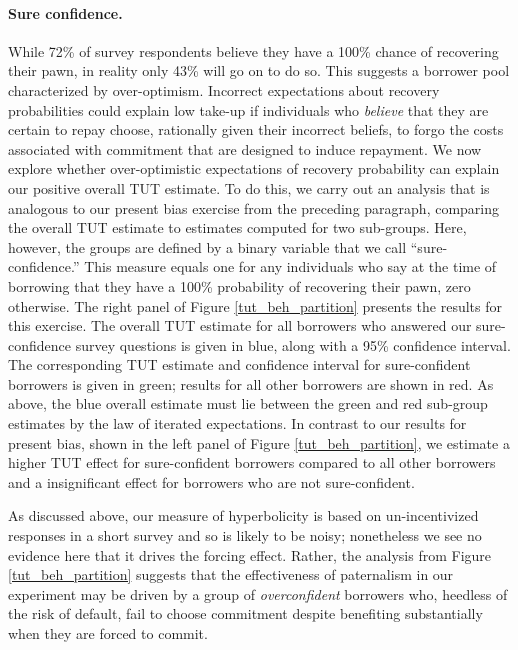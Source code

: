 \documentclass[oneside,11pt]{article}
\begin{document}
\paragraph{Sure confidence.} While 72\% of survey respondents believe they have a 100\% chance of recovering their pawn, in reality only 43\% will go on to do so.  
This suggests a borrower pool characterized by over-optimism.
Incorrect expectations about recovery probabilities could explain low take-up if individuals who \emph{believe} that they are certain to repay choose, rationally given their incorrect beliefs, to forgo the costs associated with commitment that are designed to induce repayment. 
We now explore whether over-optimistic expectations of recovery probability can explain our positive overall TUT estimate.
To do this, we carry out an analysis that is analogous to our present bias exercise from the preceding paragraph, comparing the overall TUT estimate to estimates computed for two sub-groups.
Here, however, the groups are defined by a binary variable that we call ``sure-confidence.''
This measure equals one for any individuals who say at the time of borrowing that they have a 100\% probability of recovering their pawn, zero otherwise.
The right panel of Figure \ref{tut_beh_partition} presents the results for this exercise.
The overall TUT estimate for all borrowers who answered our sure-confidence survey questions is given in blue, along with a 95\% confidence interval.
The corresponding TUT estimate and confidence interval for sure-confident borrowers is given in green; results for all other borrowers are shown in red.
As above, the blue overall estimate must lie between the green and red sub-group estimates by the law of iterated expectations.
In contrast to our results for present bias, shown in the left panel of Figure \ref{tut_beh_partition}, we estimate a higher TUT effect for sure-confident borrowers compared to all other borrowers and a insignificant effect for borrowers who are not sure-confident.

As discussed above, our measure of hyperbolicity is based on un-incentivized responses in a short survey and so is likely to be noisy; nonetheless we see no evidence here that it drives the forcing effect.  Rather, the analysis from Figure \ref{tut_beh_partition} suggests that the effectiveness of paternalism in our experiment may be driven by a group of \emph{overconfident} borrowers who, heedless of the risk of default, fail to choose commitment despite benefiting substantially when they are forced to commit. 
\end{document}
